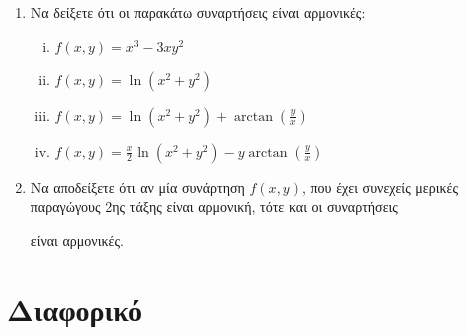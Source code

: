 \begin{enumerate}

    \item Να δείξετε ότι οι παρακάτω συναρτήσεις είναι αρμονικές:
        \begin{enumerate}[(i)]
            \item $ f(x,y) = x^{3}-3xy^{2} $
            \item $ f(x,y) = \ln(x^{2} + y^{2}) $
            \item $ f(x,y) = \ln{(x^{2}+y^{2})} + \arctan(\frac{y}{x}) $
            \item $ f(x,y) = \frac{ x }{ 2 } \ln(x^{2} + y^{2}) - y 
                \arctan(\frac{ y }{ x } ) $
        \end{enumerate}

    \item Να αποδείξετε ότι αν μία συνάρτηση $f(x,y)$, που έχει συνεχείς 
        μερικές παραγώγους 2ης τάξης είναι αρμονική, τότε και οι συναρτήσεις 
        είναι αρμονικές.
\end{enumerate}

\section{Διαφορικό}

